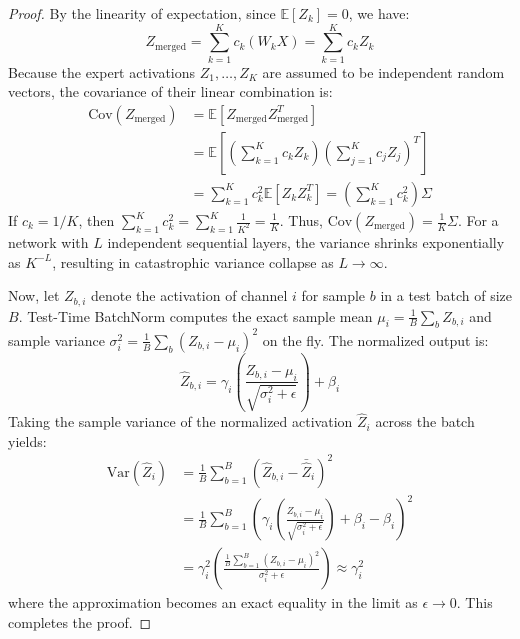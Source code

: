 \documentclass{article}
\theoremstyle{plain}
\theoremstyle{definition}
\theoremstyle{remark}
\begin{document}
\begin{proof}
By the linearity of expectation, since $\mathbb{E}[Z_k] = 0$, we have:
\begin{equation}
    Z_{\text{merged}} = \sum_{k=1}^K c_k (W_k X) = \sum_{k=1}^K c_k Z_k
\end{equation}
Because the expert activations $Z_1, \dots, Z_K$ are assumed to be independent random vectors, the covariance of their linear combination is:
\begin{align}
    \text{Cov}(Z_{\text{merged}}) &= \mathbb{E}[Z_{\text{merged}} Z_{\text{merged}}^T] \\
    &= \mathbb{E}\left[ \left(\sum_{k=1}^K c_k Z_k\right) \left(\sum_{j=1}^K c_j Z_j\right)^T \right] \\
    &= \sum_{k=1}^K c_k^2 \mathbb{E}[Z_k Z_k^T] = \left(\sum_{k=1}^K c_k^2 \right) \Sigma
\end{align}
If $c_k = 1/K$, then $\sum_{k=1}^K c_k^2 = \sum_{k=1}^K \frac{1}{K^2} = \frac{1}{K}$. Thus, $\text{Cov}(Z_{\text{merged}}) = \frac{1}{K}\Sigma$. For a network with $L$ independent sequential layers, the variance shrinks exponentially as $K^{-L}$, resulting in catastrophic variance collapse as $L \to \infty$.

Now, let $Z_{b, i}$ denote the activation of channel $i$ for sample $b$ in a test batch of size $B$. Test-Time BatchNorm computes the exact sample mean $\mu_i = \frac{1}{B}\sum_b Z_{b, i}$ and sample variance $\sigma_i^2 = \frac{1}{B}\sum_b (Z_{b, i} - \mu_i)^2$ on the fly. The normalized output is:
\begin{equation}
    \hat{Z}_{b, i} = \gamma_i \left( \frac{Z_{b, i} - \mu_i}{\sqrt{\sigma_i^2 + \epsilon}} \right) + \beta_i
\end{equation}
Taking the sample variance of the normalized activation $\hat{Z}_i$ across the batch yields:
\begin{align}
    \text{Var}(\hat{Z}_i) &= \frac{1}{B} \sum_{b=1}^B (\hat{Z}_{b, i} - \bar{\hat{Z}}_i)^2 \\
    &= \frac{1}{B} \sum_{b=1}^B \left( \gamma_i \left( \frac{Z_{b, i} - \mu_i}{\sqrt{\sigma_i^2 + \epsilon}} \right) + \beta_i - \beta_i \right)^2 \\
    &= \gamma_i^2 \left( \frac{\frac{1}{B}\sum_{b=1}^B (Z_{b, i} - \mu_i)^2}{\sigma_i^2 + \epsilon} \right) \approx \gamma_i^2
\end{align}
where the approximation becomes an exact equality in the limit as $\epsilon \to 0$. This completes the proof.
\end{proof}
\end{document}
